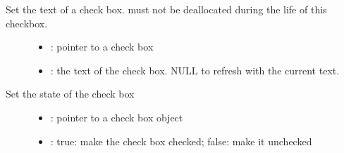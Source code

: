 \documentclass[letterpaper,10pt,english]{sphinxmanual}
\begin{document}

\begin{fulllineitems}
\label{\detokenize{object-types/cb:_CPPv421lv_cb_set_static_textP8lv_obj_tPKc}}%
\pysigstartmultiline
{}\label{\detokenize{object-types/cb:lv__cb_8h_1a4a840592d23703acc49efa4085f44150}}%
\pysigstopmultiline
Set the text of a check box.  must not be deallocated during the life of this checkbox. \begin{description}
\item[{}] \leavevmode\begin{itemize}
\item {} 
: pointer to a check box 

\item {} 
: the text of the check box. NULL to refresh with the current text. 

\end{itemize}

\end{description}


\end{fulllineitems}


\begin{fulllineitems}
\label{\detokenize{object-types/cb:_CPPv417lv_cb_set_checkedP8lv_obj_tb}}%
\pysigstartmultiline
{}\label{\detokenize{object-types/cb:lv__cb_8h_1a6a7361cf02849bfcc28b22d413f06d01}}%
\pysigstopmultiline
Set the state of the check box \begin{description}
\item[{}] \leavevmode\begin{itemize}
\item {} 
: pointer to a check box object 

\item {} 
: true: make the check box checked; false: make it unchecked 

\end{itemize}

\end{description}


\end{fulllineitems}
\end{document}

